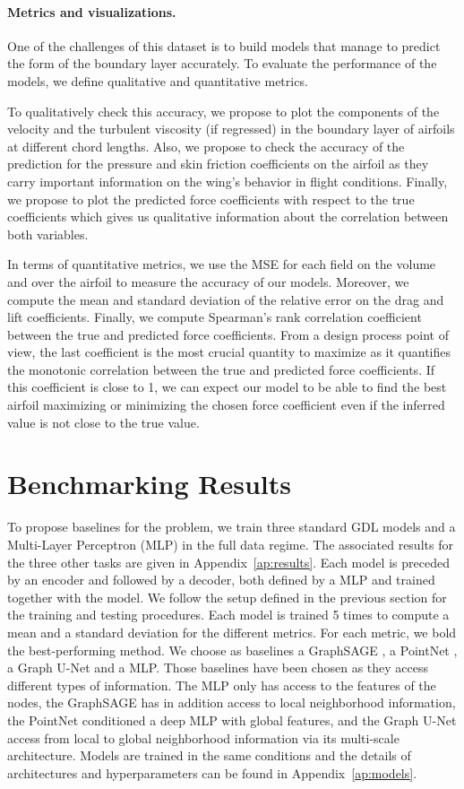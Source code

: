\paragraph{Metrics and visualizations.} One of the challenges of this dataset is to build models that manage to predict the form of the boundary layer accurately. To evaluate the performance of the models, we define qualitative and quantitative metrics.

To qualitatively check this accuracy, we propose to plot the components of the velocity and the turbulent viscosity (if regressed) in the boundary layer of airfoils at different chord lengths. Also, we propose to check the accuracy of the prediction for the pressure and skin friction coefficients on the airfoil as they carry important information on the wing's behavior in flight conditions. Finally, we propose to plot the predicted force coefficients with respect to the true coefficients which gives us qualitative information about the correlation between both variables. 

In terms of quantitative metrics, we use the MSE for each field on the volume and over the airfoil to measure the accuracy of our models. Moreover, we compute the mean and standard deviation of the relative error on the drag and lift coefficients. Finally, we compute Spearman's rank correlation coefficient between the true and predicted force coefficients. From a design process point of view, the last coefficient is the most crucial quantity to maximize as it quantifies the monotonic correlation between the true and predicted force coefficients. If this coefficient is close to 1, we can expect our model to be able to find the best airfoil maximizing or minimizing the chosen force coefficient even if the inferred value is not close to the true value.

\section{Benchmarking Results}\label{sec:results}
To propose baselines for the problem, we train three standard GDL models and a Multi-Layer Perceptron (MLP) in the full data regime. The associated results for the three other tasks are given in Appendix~\ref{ap:results}. Each model is preceded by an encoder and followed by a decoder, both defined by a MLP and trained together with the model. We follow the setup defined in the previous section for the training and testing procedures. Each model is trained 5 times to compute a mean and a standard deviation for the different metrics. For each metric, we bold the best-performing method. We choose as baselines a GraphSAGE \cite{gsage}, a PointNet \cite{qi2016pointnet}, a Graph U-Net \cite{gunet} and a MLP. Those baselines have been chosen as they access different types of information. The MLP only has access to the features of the nodes, the GraphSAGE has in addition access to local neighborhood information, the PointNet conditioned a deep MLP with global features, and the Graph U-Net access from local to global neighborhood information via its multi-scale architecture. Models are trained in the same conditions and the details of architectures and hyperparameters can be found in Appendix~\ref{ap:models}.

